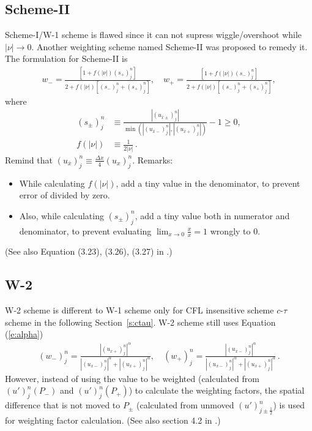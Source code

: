 \documentclass[11pt,dvips]{article}
\numberwithin{equation}{section}
\begin{document}
\subsection{Scheme-II}

Scheme-I/W-1 scheme is flawed since it can not supress wiggle/overshoot
while $|\nu|\rightarrow0$.
Another weighting scheme named Scheme-II was proposed to remedy it.
The formulation for Scheme-II is
\begin{align}
  w_- = \frac{[1+f(|\nu|)(s_+)_j^n]}
             {2 + f(|\nu|)[(s_-)_j^n+(s_+)_j^n]}, \quad
  w_+ = \frac{[1+f(|\nu|)(s_-)_j^n]}
             {2 + f(|\nu|)[(s_-)_j^n+(s_+)_j^n]}, \label{e:Scheme-II}
\end{align}
where
\begin{align}
  (s_{\pm})_j^n &\equiv
    \frac{|(u_{\bar{x}\pm})_j^n|}
         {\min\left(|(u_{\bar{x}-})_j^n|,
                    |(u_{\bar{x}+})_j^n|\right)} - 1
    \ge 0, \label{e:Scheme-IIs} \\
  f(|\nu|) &\equiv
    \frac{1}{2|\nu|}\,. \label{e:Scheme-IIf}
\end{align}
Remind that $(u_{\bar{x}})_j^n\equiv \frac{\Delta x}{4}(u_x)_j^n$.
Remarks:
\begin{itemize}
\item While calculating $f(|\nu|)$, add a tiny value in the denominator,
to prevent error of divided by zero.
\item Also, while calculating $(s_{\pm})_j^n$, add a tiny value both in
numerator and denominator, to prevent evaluating
$\lim_{x\rightarrow0}\frac{x}{x}=1$ wrongly to 0.
\end{itemize}
(See also Equation (3.23), (3.26), (3.27) in \cite{chang_courant_2002}.)

\subsection{W-2}

W-2 scheme is different to W-1 scheme only for CFL insensitive scheme
$c$-$\tau$ scheme in the following Section~\ref{s:ctau}.
W-2 scheme still uses Equation (\ref{e:alpha})
\begin{align*}
  (w_-)_j^n =
    \frac{|(u_{x+})_j^n|^{\alpha}}
         {|(u_{x-})_j^n|^{\alpha}+|(u_{x+})_j^n|^{\alpha}}, \quad
  (w_+)_j^n =
    \frac{|(u_{x-})_j^n|^{\alpha}}
         {|(u_{x-})_j^n|^{\alpha}+|(u_{x+})_j^n|^{\alpha}}\,.
\end{align*}
However, instead of using the value to be weighted (calculated from
$(u')_j^n(P_-)$ and $(u')_j^n(P_+)$) to calculate the weighting factors, the
spatial difference that is not moved to $P_{\pm}$ (calculated from unmoved
$(u')_{j\pm\frac{1}{2}}^n$) is used for weighting factor calculation.  (See
also section 4.2 in \cite{chang_multi-dimensional_2003}.)
\end{document}
